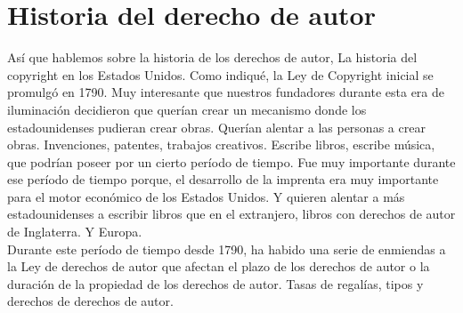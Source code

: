 \documentclass[10pt]{book}
\begin{document}
\section{Historia del derecho de autor}
Así que hablemos sobre la historia de los derechos de autor, La historia del copyright en los Estados Unidos. Como indiqué, la Ley de Copyright inicial se promulgó en 1790. Muy interesante que nuestros fundadores durante esta era de iluminación decidieron que querían crear un mecanismo donde los estadounidenses pudieran crear obras. Querían alentar a las personas a crear obras. Invenciones, patentes, trabajos creativos. Escribe libros, escribe música, que podrían poseer por un cierto período de tiempo. Fue muy importante durante ese período de tiempo porque, el desarrollo de la imprenta era muy importante para el motor económico de los Estados Unidos. Y quieren alentar a más estadounidenses a escribir libros que en el extranjero, libros con derechos de autor de Inglaterra. Y Europa.\\
Durante este período de tiempo desde 1790, ha habido una serie de enmiendas a la Ley de derechos de autor que afectan el plazo de los derechos de autor o la duración de la propiedad de los derechos de autor. Tasas de regalías, tipos y derechos de derechos de autor. \\
\end{document}
